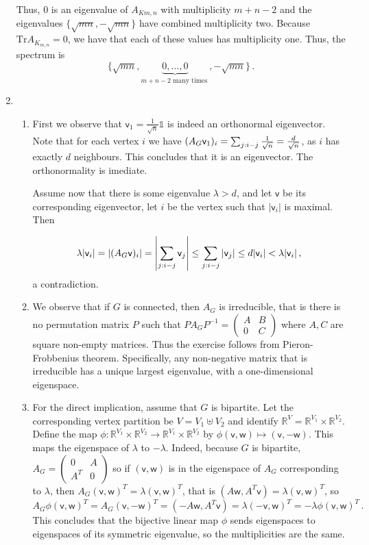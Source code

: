 \documentclass[kulak]{tplt}
\theoremstyle{definition}
\newcommand{\R}{\mathbb{R}}
\newcommand{\vv}{\mathsf{v}}
\newcommand{\vw}{\mathsf{w}}
\newcommand{\Tr}{\mathrm{Tr}}
\begin{document}
\begin{enumerate}
Thus, $0$ is an eigenvalue of $A_{K{m, n}}$ with multiplicity $m+n-2$ and the eigenvalues $\{ \sqrt{mn}, -\sqrt{mn}\}$ have combined multiplicity two.
Because $\Tr A_{K_{m, n}} =0 $, we have that each of these values has multiplicity one.
Thus, the spectrum is 
$$ \{ \sqrt{mn}, \underbrace{0, \ldots, 0}_{m+n-2 \text{ many times }}, -\sqrt{mn} \} \, . $$

\item 
\begin{enumerate}
\item 
First we observe that $\vv_1 = \frac{1}{\sqrt{n}} \mathbb{1}$ is indeed an orthonormal eigenvector.
Note that for each vertex $i$ we have $(A_G \vv_1)_i = \sum_{j : i\-- j} \frac{1}{\sqrt{n}} = \frac{d}{\sqrt{n}}$, as $i$ has exactly $d$ neighbours.
This concludes that it is an eigenvector.
The orthonormality is imediate.

Assume now that there is some eigenvalue $\lambda > d$, and let $\vv $ be its corresponding eigenvector, let $i$ be the vertex such that $|\vv_i|$ is maximal.
Then 

$$\lambda |\vv_i | = |(A_G \vv)_i| = \left|\sum_{j : i\-- j} \vv_j \right| \leq \sum_{j : i\-- j} |\vv_j| \leq d |\vv_i| < \lambda |\vv_i | \, ,$$
a contradiction.

\item 
We observe that if $G$ is connected, then $A_G$ is irreducible, that is there is no permutation matrix $P$ such that $PA_GP^{-1} = \begin{pmatrix}
A&B\\ 0 & C\end{pmatrix}$ where $A, C$ are square non-empty matrices.
Thus the exercise follows from Pieron-Frobbenius theorem.
Specifically, any non-negative matrix that is irreducible has a unique largest eigenvalue, with a one-dimensional eigenspace.

\item 
For the direct implication, assume that $G$ is bipartite.
Let the corresponding vertex partition be $V = V_1 \uplus V_2$ and identify $\R^V = \R^{V_1} \times \R^{V_2}$.
Define the map $\phi : \R^{V_1} \times \R^{V_2} \to \R^{V_1} \times \R^{V_2}$ by $\phi(\vv, \vw) \mapsto (\vv, -\vw)$.
This maps the eigenspace of $\lambda $ to $-\lambda$.
Indeed, because $G$ is bipartite, $A_G = \begin{pmatrix}
0 & A\\
A^T & 0
\end{pmatrix}$ so if $(\vv, \vw)$ is in the eigenspace of $A_G$ corresponding to $\lambda$, then $A_G (\vv, \vw)^T = \lambda (\vv, \vw)^T$, that is $(A\vw, A^T\vv) = \lambda (\vv, \vw)^T$, so 
$$A_G \phi(\vv, \vw)^T = A_G (\vv, -\vw)^T = (-A\vw, A^T\vv) = \lambda (-\vv, \vw)^T  = -\lambda \phi(\vv, \vw)^T\, . $$
This concludes that the bijective linear map $\phi$ sends eigenspaces to eigenspaces of its symmetric eigenvalue, so the multiplicities are the same.


\end{enumerate}
\end{enumerate}
\end{document}
